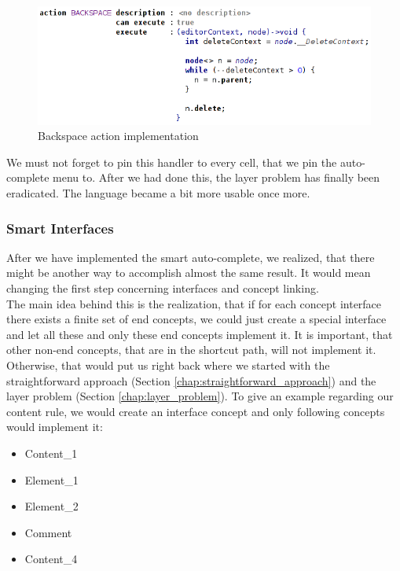 \begin{figure}[h]
	\centering
	\includegraphics[width=\textwidth]{./img/backspace_action.png}
	\caption{Backspace action implementation}
	\label{fig:backspace_action}
\end{figure}

We must not forget to pin this handler to every cell, that we pin the auto-complete menu to.
After we had done this, the layer problem has finally been eradicated.
The language became a bit more usable once more.

\subsubsection{Smart Interfaces}

After we have implemented the smart auto-complete, we realized, that there might be another way to accomplish almost the same result.
It would mean changing the first step concerning interfaces and concept linking.
\\

The main idea behind this is the realization, that if for each concept interface there exists a finite set of end concepts, we could just create a special interface and let all these and only these end concepts implement it.
It is important, that other non-end concepts, that are in the shortcut path, will not implement it.
Otherwise, that would put us right back where we started with the straightforward approach (Section \ref{chap:straightforward_approach}) and the layer problem (Section \ref{chap:layer_problem}).
To give an example regarding our content rule, we would create an  interface concept and only following concepts would implement it:

\begin{itemize}
	\itemsep0em
	\item Content{\_}1
	\item Element{\_}1
	\item Element{\_}2
	\item Comment
	\item Content{\_}4
\end{itemize}

